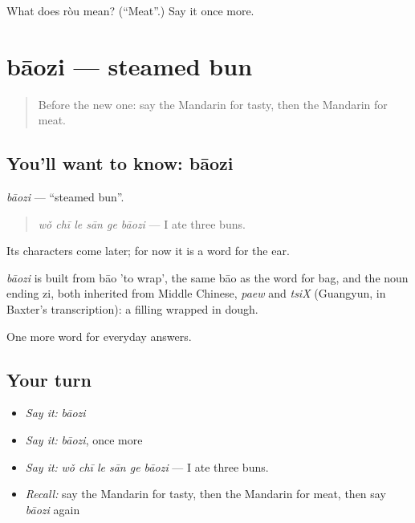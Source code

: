 \begin{tcolorbox}[breakable,colback=teal!4,colframe=teal!35!black,title={Before you move on}]
What does ròu mean? (\textquotedblleft{}Meat\textquotedblright{}.) Say it once more.
\end{tcolorbox}
\section[bāozi]{bāozi — steamed bun}

\label{lesson:ZH-C70-baozi}



\begin{quote}
Before the new one: say the Mandarin for tasty, then the Mandarin for meat.
\end{quote}

\subsection*{You'll want to know: bāozi}
\emph{bāozi} — \textquotedblleft{}steamed bun\textquotedblright{}.

\begin{quote}
\emph{wǒ chī le sān ge bāozi} — I ate three buns.
\end{quote}

Its characters come later; for now it is a word for the ear.

\begin{cousinweb}
\emph{bāozi} is built from bāo 'to wrap', the same bāo as the word for bag, and the noun ending zi, both inherited from Middle Chinese, \emph{paew} and \emph{tsiX} (Guangyun, in Baxter's transcription): a filling wrapped in dough.
\end{cousinweb}

\begin{grammarlens}[title={What you've built}]
One more word for everyday answers.
\end{grammarlens}

\subsection*{Your turn}
\begin{itemize}
\raggedright
  \item \emph{Say it:} \emph{bāozi}
  \item \emph{Say it:} \emph{bāozi}, once more
  \item \emph{Say it:} \emph{wǒ chī le sān ge bāozi} — I ate three buns.
  \item \emph{Recall:} say the Mandarin for tasty, then the Mandarin for meat, then say \emph{bāozi} again
\end{itemize}

